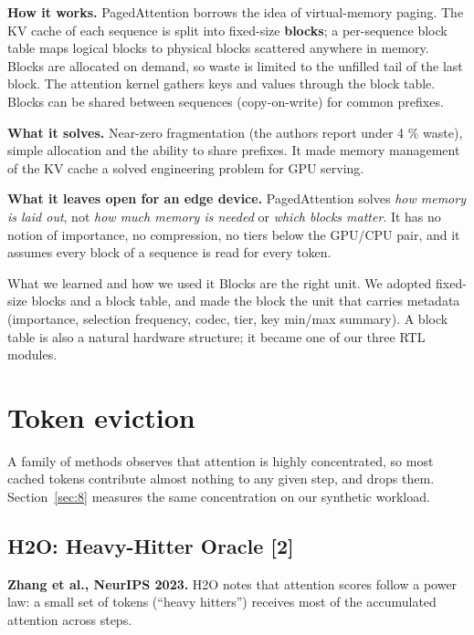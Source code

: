 \documentclass[12pt,a4paper]{report}
\begin{document}
\textbf{How it works.} PagedAttention borrows the idea of virtual-memory paging. The KV cache of each sequence is split into fixed-size \textbf{blocks}; a per-sequence block table maps logical blocks to physical blocks scattered anywhere in memory. Blocks are allocated on demand, so waste is limited to the unfilled tail of the last block. The attention kernel gathers keys and values through the block table. Blocks can be shared between sequences (copy-on-write) for common prefixes.

\textbf{What it solves.} Near-zero fragmentation (the authors report under 4 \% waste), simple allocation and the ability to share prefixes. It made memory management of the KV cache a solved engineering problem for GPU serving.

\textbf{What it leaves open for an edge device.} PagedAttention solves \textit{how memory is laid out}, not \textit{how much memory is needed} or \textit{which blocks matter}. It has no notion of importance, no compression, no tiers below the GPU/CPU pair, and it assumes every block of a sequence is read for every token.

\begin{calloutbox}{What we learned and how we used it}
Blocks are the right unit. We adopted fixed-size blocks and a block table, and made the block the unit that carries metadata (importance, selection frequency, codec, tier, key min/max summary). A block table is also a natural hardware structure; it became one of our three RTL modules.

\end{calloutbox}
\section{Token eviction}\label{sec:2_4}
A family of methods observes that attention is highly concentrated, so most cached tokens contribute almost nothing to any given step, and drops them. Section~\ref{sec:8} measures the same concentration on our synthetic workload.

\subsection{H2O: Heavy-Hitter Oracle [2]}
\textbf{Zhang et al., NeurIPS 2023.} H2O notes that attention scores follow a power law: a small set of tokens (“heavy hitters”) receives most of the accumulated attention across steps.
\end{document}
